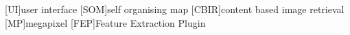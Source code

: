 %
%
%
%
%
%


\begin{acronym}[TDMA]

[UI]{user interface}
[SOM]{self organising map}
[CBIR]{content based image retrieval}
[MP]{megapixel}
[FEP]{Feature Extraction Plugin}

\end{acronym}